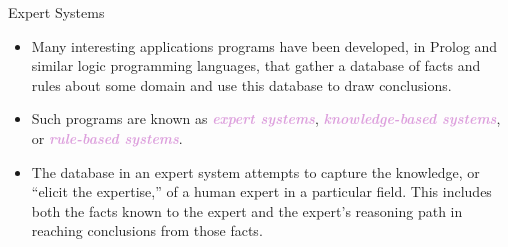 \documentclass[xcolor=dvipsnames,9pt,hide notes]{beamer}
\theoremstyle{definition}
\theoremstyle{remark}
\numberwithin{theorem}{section}
\numberwithin{claim}{section}
\numberwithin{equation}{section}
\numberwithin{conjecture}{section}
\newcommand{\defn}[1]{\textcolor{Plum}{\textit{\textbf{#1}}}}
\begin{document}
\begin{frame}{Expert Systems}
  \begin{itemize}
  \item
Many interesting applications programs have been developed, in Prolog and
similar logic programming languages, that gather a database of facts and rules
about some domain and use this database to draw conclusions. 
\item<2->Such programs are known as \defn{expert systems}, \defn{knowledge-based
    systems}, or \defn{rule-based systems}. 
\item<3->  The database in an expert system attempts to capture the knowledge, or ``elicit
  the expertise,'' of a human expert in a particular field. 
This includes both the facts known to the expert and the expert's reasoning path
in reaching conclusions from those facts. 
  \end{itemize}
\end{frame}
\end{document}
